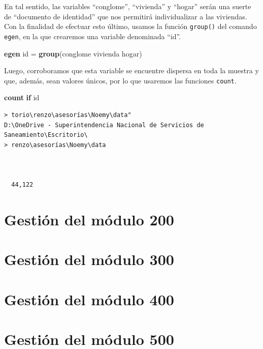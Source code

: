 \documentclass[
]{book}
\newenvironment{Shaded}{\begin{snugshade}}{\end{snugshade}}
\newcommand{\FunctionTok}[1]{\textcolor[rgb]{0.13,0.29,0.53}{\textbf{#1}}}
\newcommand{\KeywordTok}[1]{\textcolor[rgb]{0.13,0.29,0.53}{\textbf{#1}}}
\newcommand{\NormalTok}[1]{#1}
\theoremstyle{definition}
\theoremstyle{definition}
\theoremstyle{definition}
\theoremstyle{definition}
\theoremstyle{remark}
\begin{document}
En tal sentido, las variables ``conglome'', ``vivienda'' y ``hogar'' serán una suerte de ``documento de identidad'' que nos permitirá individualizar a las viviendas. Con la finalidad de efectuar esto último, usamos la función \texttt{group()} del comando \texttt{egen}, en la que crearemos una variable denominada ``id''.

\begin{Shaded}
\begin{Highlighting}[]
\KeywordTok{egen}\NormalTok{ id = }\FunctionTok{group}\NormalTok{(conglome vivienda hogar)}
\end{Highlighting}
\end{Shaded}

Luego, corroboramos que esta variable se encuentre dispersa en toda la muestra y que, además, sean valores únicos, por lo que usaremos las funciones \texttt{count}.

\begin{Shaded}
\begin{Highlighting}[]
\FunctionTok{count} \KeywordTok{if}\NormalTok{ id}
\end{Highlighting}
\end{Shaded}

\begin{verbatim}
> torio\renzo\asesorías\Noemy\data"
D:\OneDrive - Superintendencia Nacional de Servicios de Saneamiento\Escritorio\
> renzo\asesorías\Noemy\data



  44,122
\end{verbatim}

\hypertarget{gestiuxf3n-del-muxf3dulo-200}{%
\section{Gestión del módulo 200}\label{gestiuxf3n-del-muxf3dulo-200}}

\hypertarget{gestiuxf3n-del-muxf3dulo-300}{%
\section{Gestión del módulo 300}\label{gestiuxf3n-del-muxf3dulo-300}}

\hypertarget{gestiuxf3n-del-muxf3dulo-400}{%
\section{Gestión del módulo 400}\label{gestiuxf3n-del-muxf3dulo-400}}

\hypertarget{gestiuxf3n-del-muxf3dulo-500}{%
\section{Gestión del módulo 500}\label{gestiuxf3n-del-muxf3dulo-500}}
\end{document}
